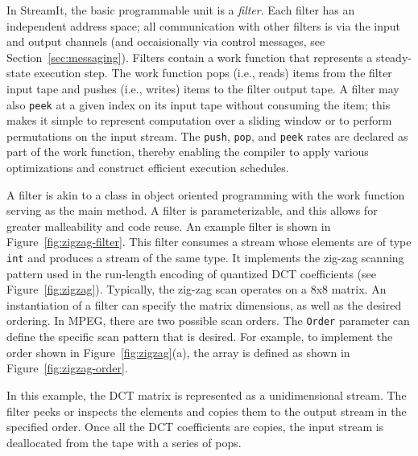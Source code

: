In StreamIt, the basic programmable unit is a {\it filter}.  Each
filter has an independent address space; all communication with other
filters is via the input and output channels (and occaisionally via
control messages, see Section~\ref{sec:messaging}).  Filters contain a
work function that represents a steady-state execution step.  The work
function pops (i.e., reads) items from the filter input tape and
pushes (i.e., writes) items to the filter output tape. A filter may
also {\tt peek} at a given index on its input tape without consuming
the item; this makes it simple to represent computation over a sliding
window or to perform permutations on the input stream. The {\tt push},
{\tt pop}, and {\tt peek} rates are declared as part of the work
function, thereby enabling the compiler to apply various optimizations
and construct efficient execution schedules.

A filter is akin to a class in object oriented programming with the
work function serving as the main method. A filter is parameterizable,
and this allows for greater malleability and code reuse. An example
filter is shown in Figure~\ref{fig:zigzag-filter}. This filter
consumes a stream whose elements are of type {\tt int} and produces a
stream of the same type. It implements the zig-zag scanning pattern
used in the run-length encoding of quantized DCT coefficients (see
Figure~\ref{fig:zigzag}). Typically, the zig-zag scan operates on a
8x8 matrix. An instantiation of a filter can specify the matrix
dimensions, as well as the desired ordering. In MPEG, there are two
possible scan orders. The {\tt Order} parameter can define the
specific scan pattern that is desired. For example, to implement the
order shown in Figure~\ref{fig:zigzag}(a), the array is defined as
shown in Figure~\ref{fig:zigzag-order}.

In this example, the DCT matrix is represented as a unidimensional
stream. The filter peeks or inspects the elements and copies them to
the output stream in the specified order. Once all the DCT
coefficients are copies, the input stream is deallocated from the tape
with a series of pops.

